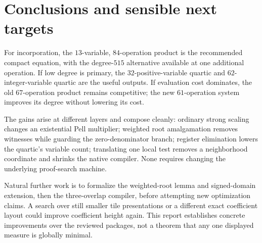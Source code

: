 \documentclass[11pt,a4paper]{article}
\theoremstyle{remark}\newtheorem{remark}[theorem]{Remark}
\begin{document}
\section{Conclusions and sensible next targets}

For incorporation, the $13$-variable, $84$-operation product is the
recommended compact equation, with the degree-$515$ alternative
available at one additional operation. If low degree is primary,
the $32$-positive-variable quartic and $62$-integer-variable quartic
are the useful outputs. If evaluation cost dominates, the old
$67$-operation product remains competitive; the new $61$-operation
system improves its degree without lowering its cost.

The gains arise at different layers and compose cleanly:
ordinary strong scaling changes an existential Pell multiplier;
weighted root amalgamation removes witnesses while guarding the
zero-denominator branch; register elimination lowers the quartic's
variable count; translating one local test removes a neighborhood
coordinate and shrinks the native compiler. None requires changing
the underlying proof-search machine.

Natural further work is to formalize the weighted-root lemma and
signed-domain extension, then the three-overlap compiler, before
attempting new optimization claims. A search over still smaller
tile presentations or a different exact coefficient layout could
improve coefficient height again. This report establishes concrete
improvements over the reviewed packages, not a theorem that any
one displayed measure is globally minimal.
\end{document}
